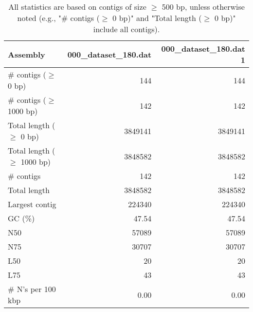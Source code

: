 \documentclass[12pt,a4paper]{article}
\begin{document}
\begin{table}[ht]
\begin{center}
\caption{All statistics are based on contigs of size $\geq$ 500 bp, unless otherwise noted (e.g., "\# contigs ($\geq$ 0 bp)" and "Total length ($\geq$ 0 bp)" include all contigs).}
\begin{tabular}{|l*{2}{|r}|}
\hline
Assembly & 000\_dataset\_180.dat & 000\_dataset\_180.dat 1 \\ \hline
\# contigs ($\geq$ 0 bp) & 144 & 144 \\ \hline
\# contigs ($\geq$ 1000 bp) & 142 & 142 \\ \hline
Total length ($\geq$ 0 bp) & 3849141 & 3849141 \\ \hline
Total length ($\geq$ 1000 bp) & 3848582 & 3848582 \\ \hline
\# contigs & 142 & 142 \\ \hline
Total length & 3848582 & 3848582 \\ \hline
Largest contig & 224340 & 224340 \\ \hline
GC (\%) & 47.54 & 47.54 \\ \hline
N50 & 57089 & 57089 \\ \hline
N75 & 30707 & 30707 \\ \hline
L50 & 20 & 20 \\ \hline
L75 & 43 & 43 \\ \hline
\# N's per 100 kbp & 0.00 & 0.00 \\ \hline
\end{tabular}
\end{center}
\end{table}
\end{document}
